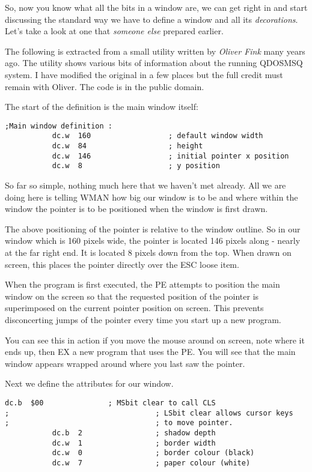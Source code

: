 So, now you know what all the bits in a window are, we can get right
    in and start discussing the standard way we have to define a window and
    all its \emph{decorations}. Let's take a look at one that
 \emph{someone else} prepared earlier.

The following is extracted from a small utility written by \emph{Oliver
    Fink} many years ago. The utility shows various bits of information about
    the running QDOSMSQ system. I have modified the original in a few places
    but the full credit must remain with Oliver. The code is in the public
    domain.

The start of the definition is the main window itself:

\begin{lstlisting}[firstnumber=1,caption={Main Window - Fixed Part}]
;Main window definition :
           dc.w  160                  ; default window width
           dc.w  84                   ; height
           dc.w  146                  ; initial pointer x position 
           dc.w  8                    ; y position
\end{lstlisting}

So far so simple, nothing much here that we haven't met already. All
    we are doing here is telling WMAN how big our window is to be and where
    within the window the pointer is to be positioned when the window is first
    drawn.

The above positioning of the pointer is relative to the window
    outline. So in our window which is 160 pixels wide, the pointer is located
    146 pixels along -{} nearly at the far right end. It is located 8 pixels
    down from the top. When drawn on screen, this places the pointer directly
    over the ESC loose item.

When the program is first executed, the PE attempts to position the
    main window on the screen so that the requested position of the pointer is
    superimposed on the current pointer position on screen. This prevents
    disconcerting jumps of the pointer every time you start up a new
    program.

You can see this in action if you move the mouse around on screen,
    note where it ends up, then EX a new program that uses the PE. You will
    see that the main window appears wrapped around where you last saw the
    pointer.

Next we define the attributes for our window.

\begin{lstlisting}[firstnumber=last,caption={Main Window - Window Attributes}]
           dc.b  $00               ; MSbit clear to call CLS
;                                  ; LSbit clear allows cursor keys
;                                  ; to move pointer.
           dc.b  2                 ; shadow depth 
           dc.w  1                 ; border width 
           dc.w  0                 ; border colour (black)
           dc.w  7                 ; paper colour (white)
\end{lstlisting}

